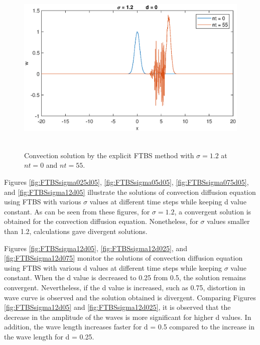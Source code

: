 \documentclass[letterpaper,12pt]{article}
\begin{document}
\begin{figure}[H] 
	\centering 
	\includegraphics[max height=8.5cm]{graphs/FTBS/Convection/sigma12d0.eps}
	\caption{Convection solution by the explicit FTBS method with $\sigma= 1.2$ at $nt=0$ and $nt=55$.}
	 \label{fig:FTBSsigma12d0}
\end{figure}

Figures \ref{fig:FTBSsigma025d05}, \ref{fig:FTBSsigma05d05}, \ref{fig:FTBSsigma075d05}, and \ref{fig:FTBSsigma12d05}
illustrate the solutions of convection diffusion equation using FTBS with various $\sigma$ values at different time
steps while keeping d value constant. As can be seen from these figures, for $\sigma = 1.2$, a convergent solution
is obtained for the convection diffusion equation. Nonetheless, for $\sigma$ values smaller than 1.2, calculations
gave divergent solutions.
\vspace{1em}

Figures \ref{fig:FTBSsigma12d05}, \ref{fig:FTBSsigma12d025}, and \ref{fig:FTBSsigma12d075} monitor the 
solutions of convection diffusion equation using FTBS with various d values at different time steps
while keeping $\sigma$ value constant. When the d value is decreased to 0.25 from 0.5, the solution remains
convergent. Nevertheless, if the d value is increased, such as 0.75, distortion in wave curve is observed and
the solution obtained is divergent. Comparing Figures \ref{fig:FTBSsigma12d05} and \ref{fig:FTBSsigma12d025},
it is observed that the decrease in the amplitude of the waves is more significant for higher d values. In addition,
the wave length increases faster for d = 0.5 compared to the increase in the wave length for d = 0.25.
\end{document}
